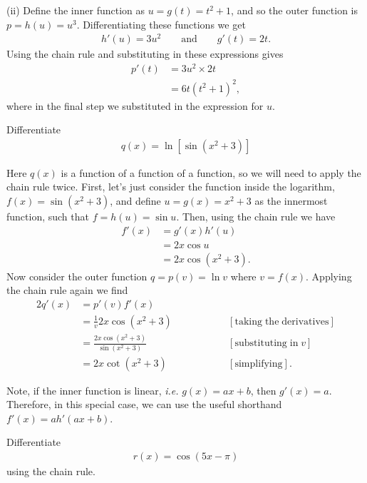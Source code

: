 (ii) Define the inner function as $u=g(t)=t^2+1$, and so the outer function is $p=h(u)=u^3$. Differentiating these functions we get 
\begin{align*}
    h'(u)=3u^2 \qquad \mathrm{and} \qquad g'(t)=2t.
\end{align*} 
Using the chain rule and substituting in these expressions gives
\begin{align*}
    p'(t) &= 3u^2 \times 2t \\
    &= 6t(t^2+1)^2,
\end{align*}
where in the final step we substituted in the expression for $u$.

\begin{example}
    Differentiate
    \begin{align*}
        q(x) = \ln[\sin(x^2+3)]
    \end{align*}
\end{example}

Here $q(x)$ is a function of a function of a function, so we will need to apply the chain rule twice. First, let's just consider the function inside the logarithm,  $f(x) = \sin(x^2+3)$, and define $u=g(x)=x^2+3$ as the innermost function, such that $f = h(u)= \sin u$. Then, using the chain rule we have
\begin{align*}
    f'(x) &= g'(x) h'(u) \\
    &= 2x \cos u\\
    &= 2x \cos(x^2+3).
\end{align*}
Now consider the outer function $q = p(v) =\ln v$ where $v=f(x)$. Applying the chain rule again we find
\begin{alignat*}{2}
    q'(x) &= p'(v) f'(x)\\
         &= \frac{1}{v} 2x \cos(x^2+3) \qquad\qquad &&[\mathrm{taking\;the\;derivatives}] \\
         &= \frac{2x \cos(x^2+3)}{\sin(x^2+3)} \qquad\qquad &&[\mathrm{substituting\;in\;}v]\\
        &= 2x \cot(x^2+3)  \qquad\qquad &&[\mathrm{simplifying}].
\end{alignat*}

Note, if the inner function is linear, \textit{i.e.} $g(x)=ax+b$, then $g'(x)=a$. Therefore, in this special case, we can use the useful shorthand $f'(x) = ah'(ax+b)$. 

\begin{example}
    Differentiate
    \begin{align*}
        r(x)=\cos(5x-\pi)
    \end{align*}
    using the chain rule.
\end{example}

